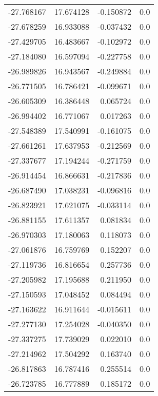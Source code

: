 \begin{tabular}{rrrr}
      -27.768167 &        17.674128 &   -0.150872 &   0.0 \\
      -27.678259 &        16.933088 &   -0.037432 &   0.0 \\
      -27.429705 &        16.483667 &   -0.102972 &   0.0 \\
      -27.184080 &        16.597094 &   -0.227758 &   0.0 \\
      -26.989826 &        16.943567 &   -0.249884 &   0.0 \\
      -26.771505 &        16.786421 &   -0.099671 &   0.0 \\
      -26.605309 &        16.386448 &    0.065724 &   0.0 \\
      -26.994402 &        16.771067 &    0.017263 &   0.0 \\
      -27.548389 &        17.540991 &   -0.161075 &   0.0 \\
      -27.661261 &        17.637953 &   -0.212569 &   0.0 \\
      -27.337677 &        17.194244 &   -0.271759 &   0.0 \\
      -26.914454 &        16.866631 &   -0.217836 &   0.0 \\
      -26.687490 &        17.038231 &   -0.096816 &   0.0 \\
      -26.823921 &        17.621075 &   -0.033114 &   0.0 \\
      -26.881155 &        17.611357 &    0.081834 &   0.0 \\
      -26.970303 &        17.180063 &    0.118073 &   0.0 \\
      -27.061876 &        16.759769 &    0.152207 &   0.0 \\
      -27.119736 &        16.816654 &    0.257736 &   0.0 \\
      -27.205982 &        17.195688 &    0.211950 &   0.0 \\
      -27.150593 &        17.048452 &    0.084494 &   0.0 \\
      -27.163622 &        16.911644 &   -0.015611 &   0.0 \\
      -27.277130 &        17.254028 &   -0.040350 &   0.0 \\
      -27.337275 &        17.739029 &    0.022010 &   0.0 \\
      -27.214962 &        17.504292 &    0.163740 &   0.0 \\
      -26.817863 &        16.787416 &    0.255514 &   0.0 \\
      -26.723785 &        16.777889 &    0.185172 &   0.0 \\

\end{tabular}
